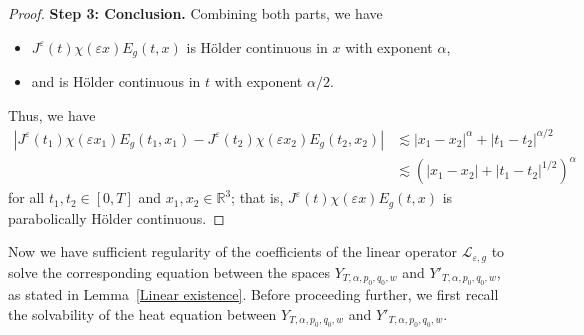 \documentclass[reqno,11pt,final]{amsart}
\theoremstyle{plain}
\numberwithin{equation}{section}
\numberwithin{theorem}{section}
\begin{document}
\begin{proof}
\textbf{Step 3: Conclusion.}
Combining both parts, we have
\begin{itemize}
\item $J^\varepsilon(t)\chi(\varepsilon x)E_g(t,x)$ is H\"older continuous in $x$ with exponent $\alpha$,
\item and is H\"older continuous in $t$ with exponent $\alpha/2$.
\end{itemize}Thus, we have
\begin{align*}
|J^\varepsilon(t_1)\chi(\varepsilon x_1)E_g(t_1,x_1) - J^\varepsilon(t_2)\chi(\varepsilon x_2)E_g(t_2,x_2)| &\lesssim |x_1 - x_2|^\alpha + |t_1 - t_2|^{\alpha/2}\\
    &\lesssim (|x_1 - x_2| + |t_1 - t_2|^{1/2})^\alpha
\end{align*}for all $t_1,t_2\in[0,T]$ and $x_1,x_2\in\mathbb{R}^3$; that is, $J^\varepsilon(t)\chi(\varepsilon x)E_g(t,x)$ is parabolically H\"older continuous.
\end{proof}

Now we have sufficient regularity of the coefficients of the linear operator $\mathcal{L}_{\varepsilon, g}$ to solve the corresponding equation between the spaces $Y_{T,\alpha,p_0,q_0,w}$ and $Y'_{T,\alpha,p_0,q_0,w}$, as stated in Lemma~\ref{Linear existence}. 
Before proceeding further, we first recall the solvability of the heat equation between $Y_{T,\alpha,p_0,q_0,w}$ and $Y'_{T,\alpha,p_0,q_0,w}$.
\end{document}
